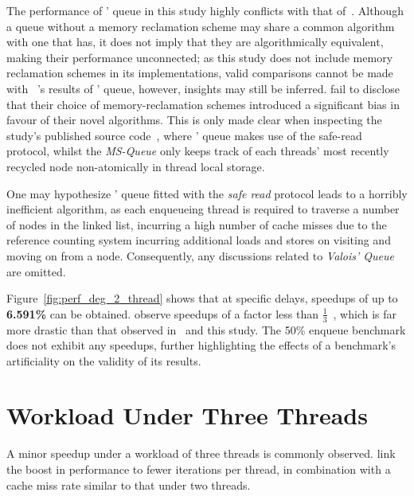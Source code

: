 The performance of \citeauthor{valois1994queues}' queue in this study highly
conflicts with that of~\citep{michael1996simple}. Although a queue without a
memory reclamation scheme may share a common algorithm with one that has, it
does not imply that they are algorithmically equivalent, making their
performance unconnected; as this study does not include memory reclamation
schemes in its implementations, valid comparisons cannot be made with
~\citep{michael1996simple}'s results of \citeauthor{valois1994queues}' queue,
however, insights may still be inferred.
\citeauthor{michael1996simple} fail to disclose that their choice of
memory-reclamation schemes introduced a significant bias in favour of their
novel algorithms. 
This is only made clear when inspecting the study's published source
code~\citep{michael1996simple_sourcecode}, where \citeauthor{valois1994queues}' queue
makes use of the safe-read protocol, whilst the \emph{MS-Queue} only keeps
track of each threads' most recently recycled node non-atomically in thread
local storage.

One may hypothesize \citeauthor{valois1994queues}' queue fitted with the \emph{safe read}
protocol leads to a horribly inefficient algorithm, as each enqueueing thread
is required to traverse a number of nodes in the linked list, incurring a high
number of cache misses due to the reference counting system incurring
additional loads and stores on visiting and moving on from a node.
Consequently, any discussions related to \emph{Valois' Queue} are omitted.

Figure~\ref{fig:perf_deg_2_thread} shows that at specific delays, speedups of
up to \textbf{6.591\%} can be obtained.
\citeauthor{michael1996simple} observe speedups of a factor less than
$\frac{1}{3}$~\citep{michael1996simple}, which is far more drastic than that
observed in~\citep{ladan2008optimistic, hoffman2007baskets} and this study. The
50\% enqueue benchmark does not exhibit any speedups, further highlighting the
effects of a benchmark's artificiality on the validity of its results.

\section{Workload Under Three Threads}
A minor speedup under a workload of three threads is commonly
observed\citep{ladan2008optimistic,michael1996simple,hoffman2007baskets}.
\citeauthor{michael1996simple} link the boost in performance to fewer
iterations per thread, in combination with a cache miss rate similar to that
under two threads.

